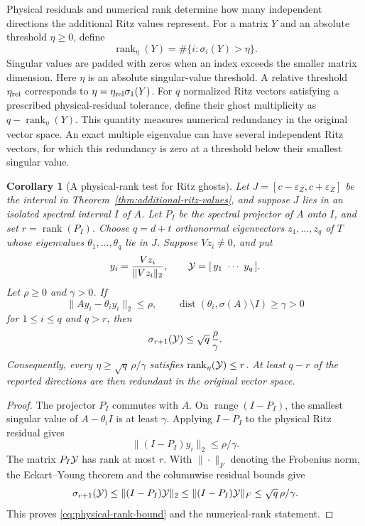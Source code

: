 \documentclass[11pt]{article}
\newtheorem{corollary}{Corollary}
\theoremstyle{definition}
\newcommand{\dist}{\operatorname{dist}}
\begin{document}
Physical residuals and numerical rank determine how many independent
directions the additional Ritz values represent.  For a matrix $Y$ and
an absolute threshold $\eta\ge0$, define
\[
 \operatorname{rank}_\eta(Y)
 =\#\{i:\sigma_i(Y)>\eta\}.
\]
Singular values are padded with zeros when an index exceeds the smaller
matrix dimension.  Here $\eta$ is an absolute singular-value threshold.  A relative threshold
$\eta_{\rm rel}$ corresponds to $\eta=\eta_{\rm rel}\sigma_1(Y)$.
For $q$ normalized Ritz vectors satisfying a prescribed physical-residual
tolerance, define their ghost multiplicity as
$q-\operatorname{rank}_\eta(Y)$.  This quantity measures numerical
redundancy in the original vector space.  An exact multiple eigenvalue can
have several independent Ritz vectors, for which this redundancy is zero
at a threshold below their smallest singular value.

\begin{corollary}[A physical-rank test for Ritz ghosts]
\label{cor:physical-rank-ghosts}
Let
$J=[c-\varepsilon_Z,c+\varepsilon_Z]$ be the interval in
Theorem~\ref{thm:additional-ritz-values}, and suppose $J$ lies in an isolated
spectral interval $I$ of $A$.  Let $P_I$ be the spectral projector of $A$
onto $I$, and set $r=\operatorname{rank}(P_I)$.  Choose
$q=d+t$ orthonormal eigenvectors $z_1,\ldots,z_q$ of $T$ whose eigenvalues
$\theta_1,\ldots,\theta_q$ lie in $J$.  Suppose $Vz_i\ne0$, and put
\[
 y_i=\frac{Vz_i}{\|Vz_i\|_2},
 \qquad {\cal Y}=[\,y_1\ \cdots\ y_q\,].
\]
Let $\rho\ge0$ and $\gamma>0$.  If
\begin{equation}
 \|Ay_i-\theta_i y_i\|_2\le\rho,
 \qquad
 \dist(\theta_i,\sigma(A)\setminus I)\ge\gamma>0
 \label{eq:physical-rank-hypotheses}
\end{equation}
for $1\le i\le q$ and $q>r$, then
\begin{equation}
 \sigma_{r+1}({\cal Y})
 \le\sqrt q\,\frac{\rho}{\gamma}.
 \label{eq:physical-rank-bound}
\end{equation}
Consequently, every
$\eta\ge\sqrt q\,\rho/\gamma$ satisfies
$\operatorname{rank}_\eta({\cal Y})\le r$.  At least $q-r$ of the reported
directions are then redundant in the original vector space.
\end{corollary}

\begin{proof}
The projector $P_I$ commutes with $A$.  On
$\operatorname{range}(I-P_I)$, the smallest singular value of
$A-\theta_iI$ is at least $\gamma$.  Applying $I-P_I$ to the physical Ritz
residual gives
\[
 \|(I-P_I)y_i\|_2\le\rho/\gamma.
\]
The matrix $P_I{\cal Y}$ has rank at most $r$.  With $\|\cdot\|_F$ denoting
the Frobenius norm, the Eckart--Young theorem and the columnwise residual
bounds give
\[
 \sigma_{r+1}({\cal Y})
 \le\|(I-P_I){\cal Y}\|_2
 \le\|(I-P_I){\cal Y}\|_F
 \le\sqrt q\,\rho/\gamma.
\]
This proves \eqref{eq:physical-rank-bound} and the numerical-rank statement.
\end{proof}
\end{document}
